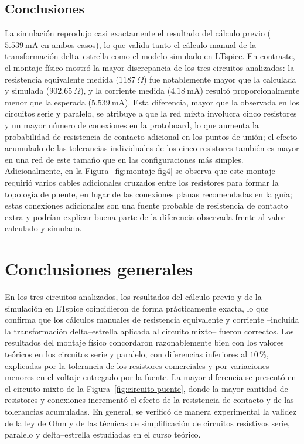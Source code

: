 \documentclass[conference,10pt]{IEEEtran}
\begin{document}
\subsection*{Conclusiones}
La simulación reprodujo casi exactamente el resultado del cálculo previo ($5.539~\mathrm{mA}$ en ambos casos), lo que valida tanto el cálculo manual de la transformación delta--estrella como el modelo simulado en LTspice. En contraste, el montaje físico mostró la mayor discrepancia de los tres circuitos analizados: la resistencia equivalente medida ($1187~\Omega$) fue notablemente mayor que la calculada y simulada ($902.65~\Omega$), y la corriente medida ($4.18~\mathrm{mA}$) resultó proporcionalmente menor que la esperada ($5.539~\mathrm{mA}$). Esta diferencia, mayor que la observada en los circuitos serie y paralelo, se atribuye a que la red mixta involucra cinco resistores y un mayor número de conexiones en la protoboard, lo que aumenta la probabilidad de resistencia de contacto adicional en los puntos de unión; el efecto acumulado de las tolerancias individuales de los cinco resistores también es mayor en una red de este tamaño que en las configuraciones más simples. Adicionalmente, en la Figura~\ref{fig:montaje-fig4} se observa que este montaje requirió varios cables adicionales cruzados entre los resistores para formar la topología de puente, en lugar de las conexiones planas recomendadas en la guía; estas conexiones adicionales son una fuente probable de resistencia de contacto extra y podrían explicar buena parte de la diferencia observada frente al valor calculado y simulado.

\section{Conclusiones generales}
En los tres circuitos analizados, los resultados del cálculo previo y de la simulación en LTspice coincidieron de forma prácticamente exacta, lo que confirma que los cálculos manuales de resistencia equivalente y corriente --incluida la transformación delta--estrella aplicada al circuito mixto-- fueron correctos. Los resultados del montaje físico concordaron razonablemente bien con los valores teóricos en los circuitos serie y paralelo, con diferencias inferiores al $10\,\%$, explicadas por la tolerancia de los resistores comerciales y por variaciones menores en el voltaje entregado por la fuente. La mayor diferencia se presentó en el circuito mixto de la Figura~\ref{fig:circuito-puente}, donde la mayor cantidad de resistores y conexiones incrementó el efecto de la resistencia de contacto y de las tolerancias acumuladas. En general, se verificó de manera experimental la validez de la ley de Ohm y de las técnicas de simplificación de circuitos resistivos serie, paralelo y delta--estrella estudiadas en el curso teórico.
\end{document}

